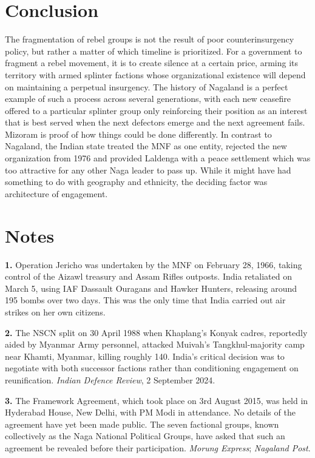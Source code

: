 \documentclass[12pt,a4paper]{article}
\begin{document}
\section{Conclusion}
The fragmentation of rebel groups is not the result of poor counterinsurgency policy, but rather a matter of which timeline is prioritized. For a government to fragment a rebel movement, it is to create silence at a certain price, arming its territory with armed splinter factions whose organizational existence will depend on maintaining a perpetual insurgency. The history of Nagaland is a perfect example of such a process across several generations, with each new ceasefire offered to a particular splinter group only reinforcing their position as an interest that is best served when the next defectors emerge and the next agreement fails. Mizoram is proof of how things could be done differently. In contrast to Nagaland, the Indian state treated the MNF as one entity, rejected the new organization from 1976 and provided Laldenga with a peace settlement which was too attractive for any other Naga leader to pass up. While it might have had something to do with geography and ethnicity, the deciding factor was architecture of engagement.

\newpage
\section*{Notes}

\noindent\textbf{1.} Operation Jericho was undertaken by the MNF on February 28, 1966, taking control of the Aizawl treasury and Assam Rifles outposts. India retaliated on March 5, using IAF Dassault Ouragans and Hawker Hunters, releasing around 195 bombs over two days. This was the only time that India carried out air strikes on her own citizens.

\vspace{0.4em}
\noindent\textbf{2.} The NSCN split on 30 April 1988 when Khaplang's Konyak cadres, reportedly aided by Myanmar Army personnel, attacked Muivah's Tangkhul-majority camp near Khamti, Myanmar, killing roughly 140. India's critical decision was to negotiate with both successor factions rather than conditioning engagement on reunification. \textit{Indian Defence Review}, 2 September 2024.

\vspace{0.4em}

\noindent\textbf{3.} The Framework Agreement, which took place on 3rd August 2015, was held in Hyderabad House, New Delhi, with PM Modi in attendance. No details of the agreement have yet been made public. The seven factional groups, known collectively as the Naga National Political Groups, have asked that such an agreement be revealed before their participation. \textit{Morung Express}; \textit{Nagaland Post}.
\end{document}

